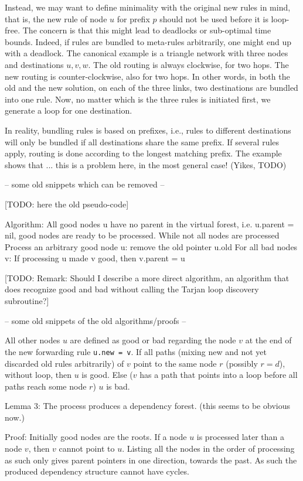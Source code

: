 Instead, we may want to define minimality with the original new rules in mind, that is, the new rule of node $u$ for prefix $p$ should not be used before it is loop-free. The concern is that this might lead to deadlocks or sub-optimal time bounds. Indeed, if rules are bundled to meta-rules arbitrarily, one might end up with a deadlock. The canonical example is a triangle network with three nodes and destinations $u,v,w$. The old routing is always clockwise, for two hops. The new routing is counter-clockwise, also for two hops. In other words, in both the old and the new solution, on each of the three links, two destinations are bundled into one rule. Now, no matter which is the three rules is initiated first, we generate a loop for one destination.

In reality, bundling rules is based on prefixes, i.e., rules to different destinations will only be bundled if all destinations share the same prefix. If several rules apply, routing is done according to the longest matching prefix. The example shows that ... this is a problem here, in the most general case! (Yikes, TODO)




-- some old snippets which can be removed --

[TODO: here the old pseudo-code]

Algorithm:
All good nodes u have no parent in the virtual forest, i.e. u.parent = nil, good nodes are ready to be processed.
While not all nodes are processed
	Process an arbitrary good node u: remove the old pointer u.old
	For all bad nodes v:
		If processing u made v good, then v.parent = u

[TODO: Remark: Should I describe a more direct algorithm, an algorithm that does recognize good and bad without calling the Tarjan loop discovery subroutine?]

-- some old snippets of the old algorithms/proofs --

All other nodes $u$ are defined as good or bad regarding the node $v$ at the end of the new forwarding rule \texttt{u.new = v}. If all paths (mixing new and not yet discarded old rules arbitrarily) of $v$ point to the same node $r$ (possibly $r = d$), without loop, then $u$ is good. Else ($v$ has a path that points into a loop before all paths reach some node $r$) $u$ is bad.

Lemma 3: The process produces a dependency forest. (this seems to be obvious now.)

Proof: Initially good nodes are the roots. If a node $u$ is processed later than a node $v$, then $v$ cannot point to $u$. Listing all the nodes in the order of processing as such only gives parent pointers in one direction, towards the past. As such the produced dependency structure cannot have cycles.
